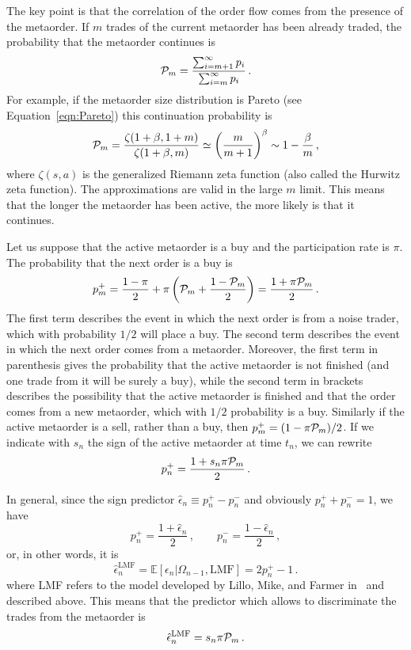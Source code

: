 \documentclass[12pt]{iopart}
\begin{document}
The key point is that the correlation of the order flow comes from the presence of the metaorder. If $m$ trades of the current metaorder has been already traded, the probability that the metaorder continues is~\cite{farmer2013efficiency}
\begin{equation*}
{\cal P}_m=\frac{\sum_{i=m+1}^\infty p_i} {\sum_{i=m}^\infty p_i}\,. 
\end{equation*}
For example, if the metaorder size distribution is Pareto (see Equation~\ref{eqn:Pareto}) this continuation probability is
\begin{equation*}
{\cal P}_m=\frac{\zeta(1+\beta,1+m)}{\zeta(1+\beta,m)}\simeq \left(\frac{m}{m+1}\right)^\beta\sim 1-\frac{\beta}{m}\,,
\end{equation*}
where $\zeta(s,a)$ is the generalized Riemann zeta function (also called the Hurwitz zeta function). The approximations are valid in the large $m$ limit. This means that the longer the metaorder has been active, the more likely is that it continues.

Let us suppose that the active metaorder is a buy and the participation rate is $\pi$. The probability that the next order is a buy is
\begin{equation*}
p^+_m=\frac{1-\pi}{2}+\pi\left({\cal P}_m+\frac{1-{\cal P}_m}{2}\right)=\frac{1+\pi{\cal P}_m}{2}\,.
\end{equation*}
The first term describes the event in which the next order is from a noise trader, which with probability $1/2$ will place a buy. The second term describes the event in which the next order comes from a metaorder. Moreover, the first term in parenthesis gives the probability that the active metaorder is not finished (and one trade from it will be surely a buy), while the second term in brackets describes the possibility that the active metaorder is finished and that the order comes from a new metaorder, which with $1/2$ probability is a buy. Similarly if the active metaorder is a sell, rather than a buy, then $p^+_m=(1-\pi{\cal P}_m)/2$. If we indicate with $s_n$ the sign of the active metaorder at time $t_n$, we can rewrite
\begin{equation*}
p^+_n=\frac{1+s_n\pi{\cal P}_m}{2}\,.
\end{equation*}

In general, since the sign predictor $\hat \epsilon_n \equiv p^+_n-p^-_n$ and obviously $p^+_n+p^-_n=1$, we have
\begin{equation*}
p^+_n=\frac{1+\hat\epsilon_n}{2}\,,\qquad p^-_n= \frac{1-\hat\epsilon_n}{2}\,,
\end{equation*}
or, in other words, it is 
\begin{equation*}
\hat{\epsilon}_n^\mathrm{LMF}=\mathbb{E}[\epsilon_n|\Omega_{n-1},\mathrm{LMF}]=2p^+_n-1\,.
\end{equation*}
where LMF refers to the model developed by Lillo, Mike, and Farmer in~\cite{lillo2005theory} and described above. This means that the predictor which allows to discriminate the trades from the metaorder is
\begin{equation}
\hat{\epsilon}_n^\mathrm{LMF}=s_n\pi {\cal P}_m\,. \label{eqn:exact_pred}
\end{equation}
\end{document}
